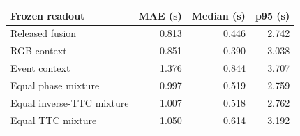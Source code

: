 \begin{tabular}{lrrr}
\toprule
Frozen readout & MAE (s) & Median (s) & p95 (s) \\
\midrule
Released fusion & 0.813 & 0.446 & 2.742 \\
RGB context & 0.851 & 0.390 & 3.038 \\
Event context & 1.376 & 0.844 & 3.707 \\
Equal phase mixture & 0.997 & 0.519 & 2.759 \\
Equal inverse-TTC mixture & 1.007 & 0.518 & 2.762 \\
Equal TTC mixture & 1.050 & 0.614 & 3.192 \\
\bottomrule
\end{tabular}
